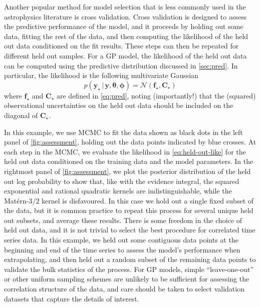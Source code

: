 \documentclass[letterpaper]{ar-1col}
\newcommand{\ydata}{\ensuremath{\boldsymbol{y}}}
\newcommand{\hyperparams}{\ensuremath{\boldsymbol{\phi}}}
\newcommand{\meanparams}{\ensuremath{\boldsymbol{\theta}}}
\begin{document}
Another popular method for model selection that is less commonly used in the astrophysics literature is cross validation.
Cross validation is designed to assess the predictive performance of the model, and it proceeds by holding out some data, fitting the rest of the data, and then computing the likelihood of the held out data conditioned on the fit results.
These steps can then be repeated for different held out samples.
For a GP model, the likelihood of the held out data can be computed using the predictive distribution discussed in \autoref{sec:pred}.
In particular, the likelihood is the following multivariate Gaussian
\begin{equation}\label{eq:held-out-like}
  p(\ydata_\star\,|\,\ydata,\meanparams, \hyperparams) = \mathcal{N}(\boldsymbol{f}_\star,\boldsymbol{C}_\star)
\end{equation}
where $\boldsymbol{f}_\star$ and $\boldsymbol{C}_\star$ are defined in \autoref{eq:pred}, noting (importantly!) that the (squared) observational uncertainties on the held out data should be included on the diagonal of $\boldsymbol{C}_\star$.

In this example, we use MCMC to fit the data shown as black dots in the left panel of \autoref{fig:assessment}, holding out the data points indicated by blue crosses.
At each step in the MCMC, we evaluate the likelihood in \autoref{eq:held-out-like} for the held out data conditioned on the training data and the model parameters.
In the rightmost panel of \autoref{fig:assessment}, we plot the posterior distribution of the held out log probability to show that, like with the evidence integral, the squared exponential and rational quadratic kernels are indistinguishable, while the Mat\'ern-3/2 kernel is disfavoured.
In this case we hold out a single fixed subset of the data, but it is common practice to repeat this process for several unique held out subsets, and average these results.
There is some freedom in the choice of held out data, and it is not trivial to select the best procedure for correlated time series data.
In this example, we held out some contiguous data points at the beginning and end of the time series to assess the model's performance when extrapolating, and then held out a random subset of the remaining data points to validate the bulk statistics of the process.
For GP models, simple ``leave-one-out'' or other uniform sampling schemes are unlikely to be sufficient for assessing the correlation structure of the data, and care should be taken to select validation datasets that capture the details of interest.
\end{document}

